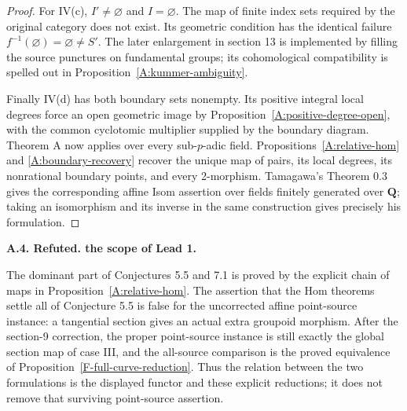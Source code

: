 \documentclass[11pt,oneside]{article}
\makeatletter
\newcounter{statementanchor}
\newenvironment{statement}[3]{%
 \refstepcounter{statementanchor}\def\@currentlabel{#1}%
 \par\addvspace{9pt}\noindent
 \textbf{#1. #2. #3.}\par\nobreak\noindent\ignorespaces
}{\par\addvspace{5pt}}
\makeatother
\begin{document}
\begin{proof}
For IV(c), $I'\ne\varnothing$ and $I=\varnothing$. The map
of finite index sets required by the original category does not
exist. Its geometric condition has the identical failure
$f^{-1}(\varnothing)=\varnothing\ne S'$. The later enlargement
in section 13 is implemented by filling the source punctures
on fundamental groups; its cohomological compatibility is
spelled out in Proposition~\ref{A:kummer-ambiguity}.

Finally IV(d) has both boundary sets nonempty. Its positive
integral local degrees force an open geometric image by
Proposition~\ref{A:positive-degree-open}, with the common
cyclotomic multiplier supplied by the boundary diagram.
Theorem A now applies over every sub-$p$-adic field.
Propositions~\ref{A:relative-hom} and
\ref{A:boundary-recovery} recover the unique map of pairs,
its local degrees, its nonrational boundary points, and every
2-morphism. Tamagawa's Theorem 0.3 gives the corresponding
affine Isom assertion over fields finitely generated over
$\mathbf Q$; taking an isomorphism and its inverse in the
same construction gives precisely his formulation.
\end{proof}

\begin{statement}{A.4}{Refuted}{the scope of Lead 1}
\label{st:A.4}
\label{A:lead-one}
The dominant part of Conjectures 5.5 and 7.1 is proved by the
explicit chain of maps in Proposition~\ref{A:relative-hom}.
The assertion that the Hom theorems settle all of Conjecture 5.5
is false for the uncorrected affine point-source instance: a
tangential section gives an actual extra groupoid morphism.
After the section-9 correction, the proper point-source
instance is still exactly the global section map of case III,
and the all-source comparison is the proved equivalence of
Proposition~\ref{F-full-curve-reduction}. Thus the relation
between the two formulations is the displayed functor and
these explicit reductions; it does not remove that surviving
point-source assertion.
\end{statement}
\end{document}
